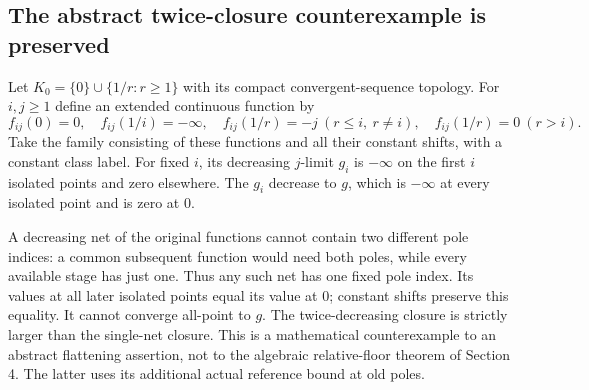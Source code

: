 \documentclass[10pt]{article}
\begin{document}
\subsection{The abstract twice-closure counterexample is preserved}
Let $K_0=\{0\}\cup\{1/r:r\geq1\}$ with its compact convergent-sequence
topology. For $i,j\geq1$ define an extended continuous function by
\[
 f_{ij}(0)=0,\quad f_{ij}(1/i)=-\infty,\quad
 f_{ij}(1/r)=-j\ (r\leq i,\ r\ne i),\quad
 f_{ij}(1/r)=0\ (r>i).
\]
Take the family consisting of these functions and all their constant
shifts, with a constant class label. For fixed $i$, its decreasing
$j$-limit $g_i$ is $-\infty$ on the first $i$ isolated points and zero
elsewhere. The $g_i$ decrease to $g$, which is $-\infty$ at every
isolated point and is zero at $0$.

A decreasing net of the original functions cannot contain two different
pole indices: a common subsequent function would need both poles, while
every available stage has just one. Thus any such net has one fixed pole
index. Its values at all later isolated points equal its value at $0$;
constant shifts preserve this equality. It cannot converge all-point to
$g$. The twice-decreasing closure is strictly larger than the single-net
closure. This is a mathematical counterexample to an abstract flattening
assertion, not to the algebraic relative-floor theorem of Section 4.
The latter uses its additional actual reference bound at old poles.
\end{document}
